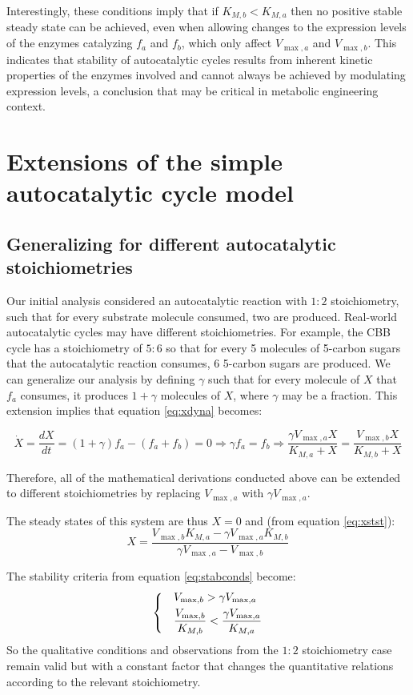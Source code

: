 \documentclass[a4page,notitlepage]{article}
\begin{document}
    Interestingly, these conditions imply that if $K_{M,b}<K_{M,a}$ then no positive stable steady state can be achieved, even when allowing changes to the expression levels of the enzymes catalyzing $f_a$ and $f_b$, which only affect $V_{\max,a}$ and $V_{\max,b}$.
    This indicates that stability of autocatalytic cycles results from inherent kinetic properties of the enzymes involved and cannot always be achieved by modulating expression levels, a conclusion that may be critical in metabolic engineering context.
\section{Extensions of the simple autocatalytic cycle model}
    \subsection{Generalizing for different autocatalytic stoichiometries}
    Our initial analysis considered an autocatalytic reaction with $1:2$ stoichiometry, such that for every substrate molecule consumed, two are produced.
    Real-world autocatalytic cycles may have different stoichiometries.
    For example, the CBB cycle has a stoichiometry of $5:6$ so that for every 5 molecules of 5-carbon sugars that the autocatalytic reaction consumes, 6 5-carbon sugars are produced.
    We can generalize our analysis by defining $\gamma$ such that for every molecule of $X$ that $f_a$ consumes, it produces $1+\gamma$ molecules of $X$, where $\gamma$ may be a fraction.
    This extension implies that equation \eqref{eq:xdyna} becomes:

    \begin{equation*}
      \dot X = \frac{dX}{dt} = (1+\gamma)f_a - (f_a + f_b) = 0 \Rightarrow \gamma f_a = f_b \Rightarrow \frac{\gamma V_{\max,a}X}{K_{M,a}+X}=\frac{V_{\max,b}X}{K_{M,b}+X}
    \end{equation*}

    Therefore, all of the mathematical derivations conducted above can be extended to different stoichiometries by replacing $V_{\max,a}$ with $\gamma V_{\max,a}$.

    The steady states of this system are thus $X=0$ and (from equation \eqref{eq:xstst}):
    \begin{equation*}
      X=\frac{V_{\max,b}K_{M,a}-\gamma V_{\max,a}K_{M,b}}{\gamma V_{\max,a}-V_{\max,b}}
    \end{equation*}

    The stability criteria from equation \eqref{eq:stabconds} become:
    \begin{equation*}
    \begin{dcases}
      & V_{\max,b}>\gamma V_{\max,a} \\
      & \frac{V_{\max,b}}{K_{M,b}}<\frac{\gamma V_{\max,a}}{K_{M,a}}
    \end{dcases}
    \end{equation*}
    So the qualitative conditions and observations from the $1:2$ stoichiometry case remain valid but with a constant factor that changes the quantitative relations according to the relevant stoichiometry.
\end{document}
